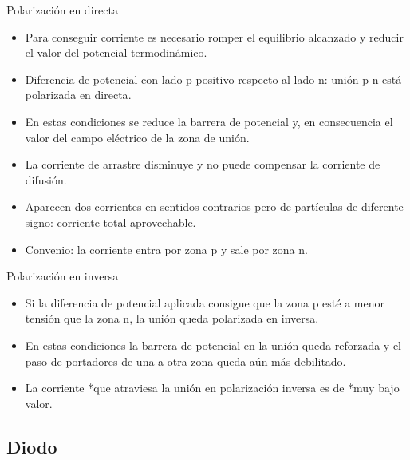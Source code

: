 \documentclass[xcolor={usenames,svgnames,dvipsnames}]{beamer}
\begin{document}
\begin{frame}[label=sec-1-4-4]{Polarización en directa}
\begin{itemize}
\item \alert{Para conseguir corriente es necesario romper el equilibrio alcanzado
y reducir el valor del potencial termodinámico}.

\item \alert{Diferencia de potencial} con lado p positivo respecto al lado n:
unión p-n está \alert{polarizada en directa}.

\item En estas condiciones \alert{se reduce la barrera de potencial} y, en
consecuencia el valor del campo eléctrico de la zona de unión.

\item La \alert{corriente de arrastre disminuye} y \alert{no puede compensar la
corriente de difusión}.

\item Aparecen dos corrientes en sentidos contrarios pero de partículas de
diferente signo: \alert{corriente total aprovechable.}

\item Convenio: la corriente entra por zona p y sale por zona n.
\end{itemize}
\end{frame}

\begin{frame}[label=sec-1-4-5]{Polarización en inversa}
\begin{itemize}
\item Si la diferencia de potencial aplicada consigue que la zona p esté a
menor tensión que la zona n, la unión queda \alert{polarizada en inversa}.

\item En estas condiciones \alert{la barrera de potencial en la unión queda
reforzada} y el paso de portadores de una a otra zona queda aún más
debilitado.

\item La \alert{corriente *que atraviesa la unión en polarización inversa es de
*muy bajo valor}.
\end{itemize}
\end{frame}

\subsection{Diodo}
\label{sec-1-5}
\end{document}
